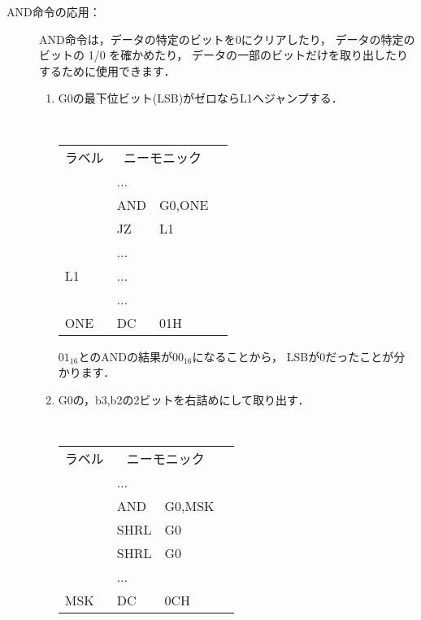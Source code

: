 \begin{description}
\begin{center}
\epsfxsize=5cm
\end{center}

\item[AND命令の応用：]
AND命令は，データの特定のビットを0にクリアしたり，
データの特定のビットの 1/0 を確かめたり，
データの一部のビットだけを取り出したりするために使用できます．

\begin{enumerate}
\item G0の最下位ビット(LSB)がゼロならL1へジャンプする．
\begin{center}
{\small\tt
\begin{tabular}{|l|l l|l}
\cline{1-3}
ラベル & \multicolumn{2}{|c|}{ニーモニック} & \\
\cline{1-3}
    & ...  &        & \\
    & AND  & G0,ONE & \\
    & JZ   & L1     & \\
    & ...  &        & \\
L1  & ...  &        & \\
    & ...  &        & \\
ONE & DC   & 01H    & \\
\cline{1-3}
\end{tabular}
}
\end{center}
$01_{16}$とのANDの結果が$00_{16}$になることから，
LSBが$0$だったことが分かります．

\item G0の，b3,b2の2ビットを右詰めにして取り出す．
\begin{center}
{\small\tt
\begin{tabular}{|l|l l|l}
\cline{1-3}
ラベル & \multicolumn{2}{|c|}{ニーモニック} & \\
\cline{1-3}
    & ...  &        & \\
    & AND  & G0,MSK & \\
    & SHRL & G0     & \\
    & SHRL & G0     & \\
    & ...  &        & \\
MSK & DC   & 0CH    & \\
\cline{1-3}
\end{tabular}
}
\end{center}


\end{enumerate}
\end{description}
